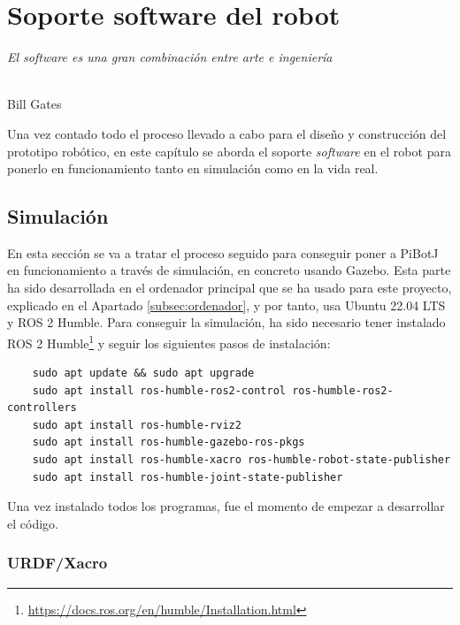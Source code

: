 \chapter{Soporte software del robot}
\label{cap:capitulo6}

\begin{flushright}
\begin{minipage}[]{10cm}
\emph{El software es una gran combinación entre arte e ingeniería}\\
\end{minipage}\\

Bill Gates\\
\end{flushright}

\vspace{1cm}
\setcounter{footnote}{84}

Una vez contado todo el proceso llevado a cabo para el diseño y construcción del prototipo robótico, en este capítulo se aborda el soporte \textit{software} en el robot para ponerlo en funcionamiento tanto en simulación como en la vida real.

\section{Simulación}
\label{sec:simulacion}

En esta sección se va a tratar el proceso seguido para conseguir poner a PiBotJ en funcionamiento a través de simulación, en concreto usando Gazebo. Esta parte ha sido desarrollada en el ordenador principal que se ha usado para este proyecto, explicado en el Apartado \ref{subsec:ordenador}, y por tanto, usa Ubuntu 22.04 LTS y ROS 2 Humble. Para conseguir la simulación, ha sido necesario tener instalado ROS 2 Humble\footnote{\url{https://docs.ros.org/en/humble/Installation.html}} y seguir los siguientes pasos de instalación: 

\begin{verbatim}
	sudo apt update && sudo apt upgrade
	sudo apt install ros-humble-ros2-control ros-humble-ros2-controllers
	sudo apt install ros-humble-rviz2
	sudo apt install ros-humble-gazebo-ros-pkgs
	sudo apt install ros-humble-xacro ros-humble-robot-state-publisher 
	sudo apt install ros-humble-joint-state-publisher
\end{verbatim}

Una vez instalado todos los programas, fue el momento de empezar a desarrollar el código. 

\subsection{URDF/Xacro}
\label{subsec:urdf}

